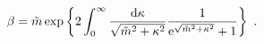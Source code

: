 \begin{equation}
\beta = \tilde{m} \exp \left\{ 2 \int_0^{\infty} \frac{{\rm d}\kappa}{\sqrt{\tilde{m}^2+\kappa^2}}
\frac{1}{{\rm e}^{\sqrt{\tilde{m}^2+\kappa^2}}+1}\right\} \ .
\label{t31}
\end{equation}

